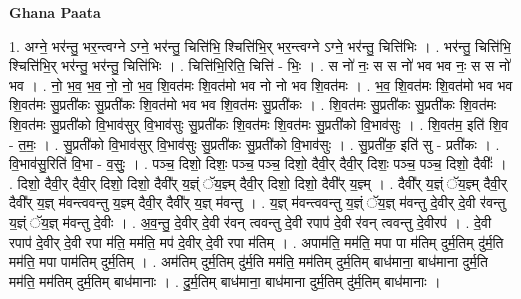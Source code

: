 \documentclass[17pt]{extarticle}
\begin{document}
\textbf{Ghana Paata } \newline

1. अग्ने॒ भर॑न्तु॒ भर॒न्त्वग्ने ऽग्ने॒ भर॑न्तु॒ चित्ति॑भि॒ श्चित्ति॑भि॒र् भर॒न्त्वग्ने ऽग्ने॒ भर॑न्तु॒ चित्ति॑भिः । . भर॑न्तु॒ चित्ति॑भि॒ श्चित्ति॑भि॒र् भर॑न्तु॒ भर॑न्तु॒ चित्ति॑भिः । . चित्ति॑भि॒रिति॒ चित्ति॑ - भिः॒ । . स नो॑ नः॒ स स नो॑ भव भव नः॒ स स नो॑ भव । . नो॒ भ॒व॒ भ॒व॒ नो॒ नो॒ भ॒व॒ शि॒वत॑मः शि॒वत॑मो भव नो नो भव शि॒वत॑मः । . भ॒व॒ शि॒वत॑मः शि॒वत॑मो भव भव शि॒वत॑मः सु॒प्रती॑कः सु॒प्रती॑कः शि॒वत॑मो भव भव शि॒वत॑मः सु॒प्रती॑कः । . शि॒वत॑मः सु॒प्रती॑कः सु॒प्रती॑कः शि॒वत॑मः शि॒वत॑मः सु॒प्रती॑को वि॒भाव॑सुर् वि॒भाव॑सुः सु॒प्रती॑कः शि॒वत॑मः शि॒वत॑मः सु॒प्रती॑को वि॒भाव॑सुः । . शि॒वत॑म॒ इति॑ शि॒व - त॒मः॒ । . सु॒प्रती॑को वि॒भाव॑सुर् वि॒भाव॑सुः सु॒प्रती॑कः सु॒प्रती॑को वि॒भाव॑सुः । . सु॒प्रती॑क॒ इति॑ सु - प्रती॑कः । . वि॒भाव॑सु॒रिति॑ वि॒भा - व॒सुः॒ । . पञ्च॒ दिशो॒ दिशः॒ पञ्च॒ पञ्च॒ दिशो॒ दैवी॒र् दैवी॒र् दिशः॒ पञ्च॒ पञ्च॒ दिशो॒ दैवीः᳚ । . दिशो॒ दैवी॒र् दैवी॒र् दिशो॒ दिशो॒ दैवी᳚र् य॒ज्ञ्ं ॅय॒ज्ञ्म् दैवी॒र् दिशो॒ दिशो॒ दैवी᳚र् य॒ज्ञ्म् । . दैवी᳚र् य॒ज्ञ्ं ॅय॒ज्ञ्म् दैवी॒र् दैवी᳚र् य॒ज्ञ् म॑वन्त्ववन्तु य॒ज्ञ्म् दैवी॒र् दैवी᳚र् य॒ज्ञ् म॑वन्तु । . य॒ज्ञ् म॑वन्त्ववन्तु य॒ज्ञ्ं ॅय॒ज्ञ् म॑वन्तु दे॒वीर् दे॒वी र॑वन्तु य॒ज्ञ्ं ॅय॒ज्ञ् म॑वन्तु दे॒वीः । . अ॒व॒न्तु॒ दे॒वीर् दे॒वी र॑वन् त्ववन्तु दे॒वी रपाप॑ दे॒वी र॑वन् त्ववन्तु दे॒वीरप॑ । . दे॒वी रपाप॑ दे॒वीर् दे॒वी रपा म॑ति॒ मम॑ति॒ मप॑ दे॒वीर् दे॒वी रपा म॑तिम् । . अपाम॑ति॒ मम॑ति॒ मपा पा म॑तिम् दुर्म॒तिम् दु॑र्म॒ति मम॑ति॒ मपा पाम॑तिम् दुर्म॒तिम् । . अम॑तिम् दुर्म॒तिम् दु॑र्म॒ति मम॑ति॒ मम॑तिम् दुर्म॒तिम् बाध॑माना॒ बाध॑माना दुर्म॒ति मम॑ति॒ मम॑तिम् दुर्म॒तिम् बाध॑मानाः । . दु॒र्म॒तिम् बाध॑माना॒ बाध॑माना दुर्म॒तिम् दु॑र्म॒तिम् बाध॑मानाः । \newline
\end{document}
